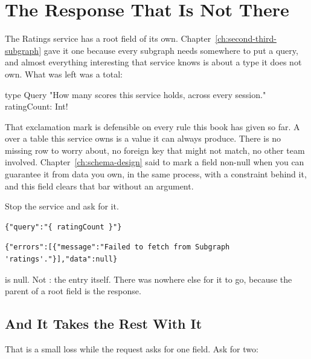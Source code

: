 \section{The Response That Is Not There}
\label{sec:ch14-the-response-that-is-not-there}

%
The Ratings service has a root field of its own.
Chapter~\ref{ch:second-third-subgraph} gave it one because every subgraph needs
somewhere to put a query, and almost everything interesting that service knows
is about a type it does not own. What was left was a total:

\begin{graphqlsdl}
type Query {
  "How many scores this service holds, across every session."
  ratingCount: Int!
}
\end{graphqlsdl}

%
That exclamation mark is defensible on every rule this book has given so far. A
 over a table this service owns is a value it can always produce.
There is no missing row to worry about, no foreign key that might not match, no
other team involved. Chapter~\ref{ch:schema-design} said to mark a field
non-null when you can guarantee it from data you own, in the same process, with
a constraint behind it, and this field clears that bar without an argument.

Stop the service and ask for it.

\begin{verbatim}
{"query":"{ ratingCount }"}
\end{verbatim}

\begin{verbatim}
{"errors":[{"message":"Failed to fetch from Subgraph 'ratings'."}],"data":null}
\end{verbatim}

%
 is null. Not : the entry itself. There was
nowhere else for it to go, because the parent of a root field is the response.

\subsection{And It Takes the Rest With It}

%
That is a small loss while the request asks for one field. Ask for two:

